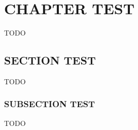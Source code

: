 \newpage
\pagestyle{plain}

\chapter{CHAPTER TEST}

TODO
\section{SECTION TEST}

TODO

\subsection{SUBSECTION TEST}

TODO
